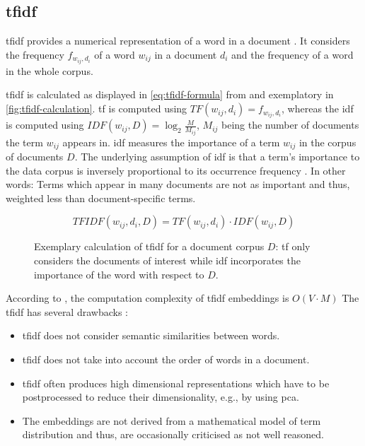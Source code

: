 \subsection{\ac{tfidf}}\label{subsec:tfidf}

\ac{tfidf} provides a numerical representation of a word in a document \cite{clusteringDocs2020}.
It considers the frequency $f_{w_{ij}, d_i}$  of a word $w_{ij}$ in a document $d_i$ and the frequency of a word in the whole corpus. 

\ac{tfidf} is calculated as displayed in \autoref{eq:tfidf-formula} from \cite{clusteringDocs2020} and exemplatory in \autoref{fig:tfidf-calculation}.
\ac{tf} is computed using $TF(w_{ij}, d_i) = f_{w_{ij}, d_i}$, whereas the \ac{idf} is computed using $IDF(w_{ij}, D) = \log_2\frac{M}{M_{ij}}$, 
$M_{ij}$ being the number of documents the term $w_{ij}$ appears in.
\ac{idf} measures the importance of a term $w_{ij}$ in the corpus of documents $D$.
The underlying assumption of \ac{idf} is that a term's importance to the data corpus is inversely proportional to its occurrence frequency \cite{tfidf2008}.
In other words: Terms which appear in many documents are not as important and thus, weighted less than document-specific terms. 

\begin{equation}
    TFIDF(w_{ij}, d_i, D) = TF(w_{ij}, d_i) \cdot IDF(w_{ij}, D)
    \label{eq:tfidf-formula}
\end{equation}


\begin{figure}[htp] %
    \centering
    
    \caption{
        Exemplary calculation of \ac{tfidf} for a document corpus $D$: 
        \ac{tf} only considers the documents of interest while 
        \ac{idf} incorporates the importance of the word with respect to $D$.
    }
    \label{fig:tfidf-calculation}
\end{figure}

According to \citeauthor{tfidf2008}, the computation complexity of \ac{tfidf} embeddings is $O(V \cdot M)$
The \ac{tfidf} has several drawbacks \cite{clusteringDocs2020,tfidf2008}:
\begin{itemize}
    \item \ac{tfidf} does not consider semantic similarities between words.
    \item \ac{tfidf} does not take into account the order of words in a document.
    \item \ac{tfidf} often produces high dimensional representations which have to be postprocessed to reduce their dimensionality, e.g., by using \ac{pca}.
    \item The embeddings are not derived from a mathematical model of term distribution and thus, are occasionally criticised as not well reasoned.
\end{itemize}